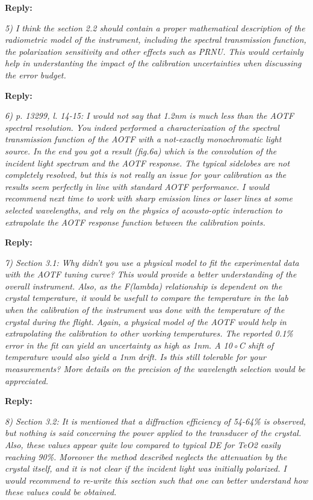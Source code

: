 \documentclass[12pt, notitlepage]{article}
\begin{document}
\textbf{Reply:}

\hrrulefill

\textit{5) I think the section 2.2 should contain a proper mathematical description of the radiometric
model of the instrument, including the spectral transmission function, the
polarization sensitivity and other effects such as PRNU. This would certainly help in
understanting the impact of the calibration uncertainties when discussing the error budget.}

\textbf{Reply:} 

\hrulefill

\textit{6) p. 13299, l. 14-15: I would not say that 1.2nm is much less than the AOTF spectral
resolution. You indeed performed a characterization of the spectral transmission
function of the AOTF with a not-exactly monochromatic light source. In the end you got
a result (fig.6a) which is the convolution of the incident light spectrum and the AOTF
response. The typical sidelobes are not completely resolved, but this is not really an
issue for your calibration as the results seem perfectly in line with standard AOTF performance.
I would recommend next time to work with sharp emission lines or laser lines
at some selected wavelengths, and rely on the physics of acousto-optic interaction to
extrapolate the AOTF response function between the calibration points.}

\textbf{Reply:} 

\hrulefill

\textit{7) Section 3.1: Why didn’t you use a physical model to fit the experimental data with
the AOTF tuning curve? This would provide a better understanding of the overall instrument.
Also, as the F(lambda) relationship is dependent on the crystal temperature,
it would be usefull to compare the temperature in the lab when the calibration of the
instrument was done with the temperature of the crystal during the flight. Again, a
physical model of the AOTF would help in extrapolating the calibration to other working
temperatures. The reported 0.1\% error in the fit can yield an uncertainty as high as
1nm. A 10◦C shift of temperature would also yield a 1nm drift. Is this still tolerable for
your measurements? More details on the precision of the wavelength selection would
be appreciated.}

\textbf{Reply:} 

\hrulefill

\textit{8) Section 3.2: It is mentioned that a diffraction efficiency of 54-64\% is observed, but
nothing is said concerning the power applied to the transducer of the crystal. Also,
these values appear quite low compared to typical DE for TeO2 easily reaching 90\%.
Moreover the method described neglects the attenuation by the crystal itself, and it is
not clear if the incident light was initially polarized. I would recommend to re-write this
section such that one can better understand how these values could be obtained.}
\end{document}
